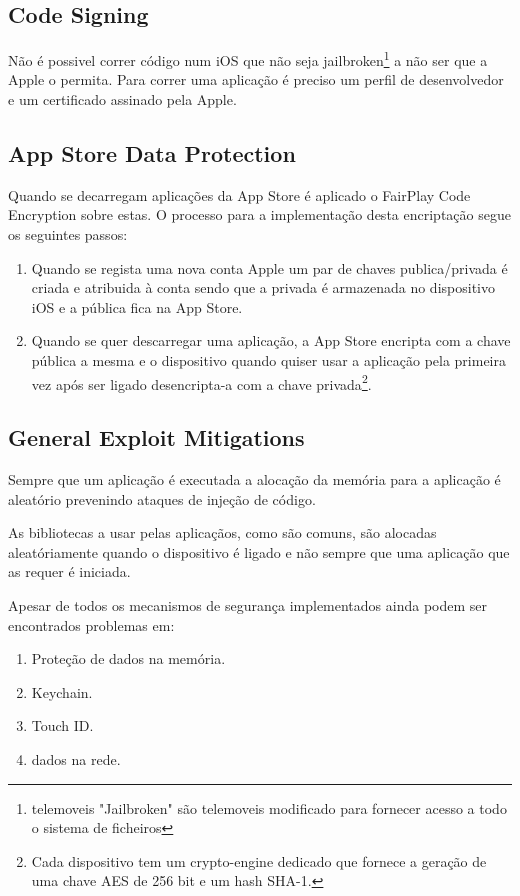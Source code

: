 \subsection{ Code Signing}
\hfill\par
	Não é possivel correr código num iOS que não seja jailbroken\footnote[3]{telemoveis "Jailbroken" são telemoveis modificado para fornecer acesso a todo o sistema de ficheiros\cite{ref_intro2}} a não ser que a Apple o permita. Para correr uma aplicação é preciso um perfil de desenvolvedor e um certificado assinado pela Apple.


\subsection{ App Store Data Protection}
\hfill\par
	Quando se decarregam aplicações da App Store é aplicado o FairPlay Code Encryption sobre estas. O processo para a implementação desta encriptação segue os seguintes passos:\par
	\begin{enumerate}
	\item Quando se regista uma nova conta Apple um par de chaves publica/privada é criada e atribuida à conta sendo que a privada é armazenada no dispositivo iOS e a pública fica na App Store.\par
	\item Quando se quer descarregar uma aplicação, a App Store encripta com a chave pública a mesma e o dispositivo quando quiser usar a aplicação pela primeira vez após ser ligado desencripta-a com a chave privada\footnote[3]{Cada dispositivo tem um crypto-engine dedicado que fornece a geração de uma chave AES de 256 bit e um hash SHA-1.}.\par
\end{enumerate}

\subsection{ General Exploit Mitigations}
\hfill\par
	Sempre que um aplicação é executada a alocação da memória para a aplicação é aleatório prevenindo ataques de injeção de código.\par
	As bibliotecas a usar pelas aplicaçãos, como são comuns, são alocadas aleatóriamente quando o dispositivo é ligado e não sempre que uma aplicação que as requer é iniciada.\par
\hfill\par
\hfill\par
Apesar de todos os mecanismos de segurança implementados ainda podem ser encontrados problemas em:
\renewcommand{\theenumi}{\Roman{enumi}}
\begin{enumerate}
	\item Proteção de dados na memória.
	\item Keychain.
	\item Touch ID.
	\item dados na rede.
\end{enumerate}
\renewcommand{\theenumi}{\arabic{enumi}}


